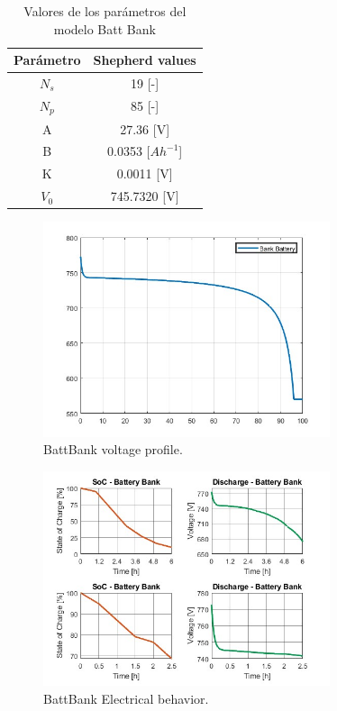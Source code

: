 \begin{table}[h]
\centering
\caption{Valores de los parámetros del modelo Batt Bank}
\label{table4}
\begin{tabular}{c|c}\hline
Parámetro& Shepherd values\\ \hline \hline 
${N}_{s}$ & 19 [-]\\
${N}_{p}$ & 85 [-]\\
A & 27.36 [V]\\
B & 0.0353 [$Ah^{-1}$] \\
K & 0.0011 [V]\\
$V_0$ & 745.7320 [V]\\
\hline \hline
\end{tabular}
\end{table}

\begin{figure}[h!]
    \centering
    \includegraphics[width=0.75\textwidth]{images/chapter05/02_BattBank/01_VoltageProfile.jpg}
    \caption{BattBank voltage profile.}
    \label{BattBank_vp}
\end{figure}

\begin{figure}[h!]
    \centering
    \includegraphics[width=0.75\textwidth]{images/chapter05/02_BattBank/02_ElecBehavior.jpg}
    \caption{BattBank Electrical behavior.}
    \label{BattBank_eb}
\end{figure}

